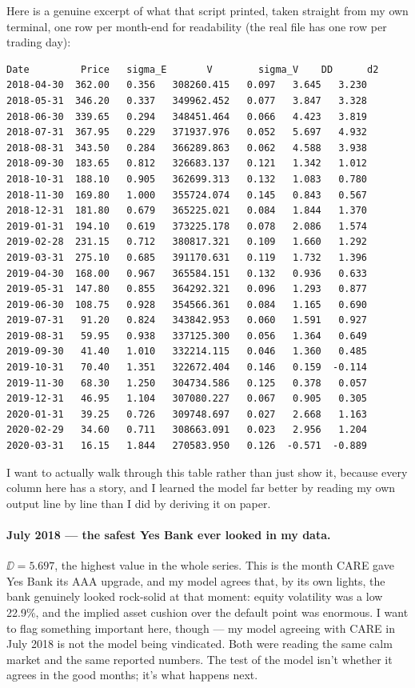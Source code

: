 Here is a genuine excerpt of what that script printed, taken straight from my own terminal, one row per month-end for readability (the real file has one row per trading day):

\begin{verbatim}
Date         Price   sigma_E       V        sigma_V    DD      d2
2018-04-30  362.00   0.356   308260.415   0.097   3.645   3.230
2018-05-31  346.20   0.337   349962.452   0.077   3.847   3.328
2018-06-30  339.65   0.294   348451.464   0.066   4.423   3.819
2018-07-31  367.95   0.229   371937.976   0.052   5.697   4.932
2018-08-31  343.50   0.284   366289.863   0.062   4.588   3.938
2018-09-30  183.65   0.812   326683.137   0.121   1.342   1.012
2018-10-31  188.10   0.905   362699.313   0.132   1.083   0.780
2018-11-30  169.80   1.000   355724.074   0.145   0.843   0.567
2018-12-31  181.80   0.679   365225.021   0.084   1.844   1.370
2019-01-31  194.10   0.619   373225.178   0.078   2.086   1.574
2019-02-28  231.15   0.712   380817.321   0.109   1.660   1.292
2019-03-31  275.10   0.685   391170.631   0.119   1.732   1.396
2019-04-30  168.00   0.967   365584.151   0.132   0.936   0.633
2019-05-31  147.80   0.855   364292.321   0.096   1.293   0.877
2019-06-30  108.75   0.928   354566.361   0.084   1.165   0.690
2019-07-31   91.20   0.824   343842.953   0.060   1.591   0.927
2019-08-31   59.95   0.938   337125.300   0.056   1.364   0.649
2019-09-30   41.40   1.010   332214.115   0.046   1.360   0.485
2019-10-31   70.40   1.351   322672.404   0.146   0.159  -0.114
2019-11-30   68.30   1.250   304734.586   0.125   0.378   0.057
2019-12-31   46.95   1.104   307080.227   0.067   0.905   0.305
2020-01-31   39.25   0.726   309748.697   0.027   2.668   1.163
2020-02-29   34.60   0.711   308663.091   0.023   2.956   1.204
2020-03-31   16.15   1.844   270583.950   0.126  -0.571  -0.889
\end{verbatim}

I want to actually walk through this table rather than just show it, because every column here has a story, and I learned the model far better by reading my own output line by line than I did by deriving it on paper.

\paragraph{July 2018 — the safest Yes Bank ever looked in my data.} $\DD=5.697$, the highest value in the whole series. This is the month CARE gave Yes Bank its AAA upgrade, and my model agrees that, by its own lights, the bank genuinely looked rock-solid at that moment: equity volatility was a low 22.9\%, and the implied asset cushion over the default point was enormous. I want to flag something important here, though — my model agreeing with CARE in July 2018 is not the model being vindicated. Both were reading the same calm market and the same reported numbers. The test of the model isn't whether it agrees in the good months; it's what happens next.

